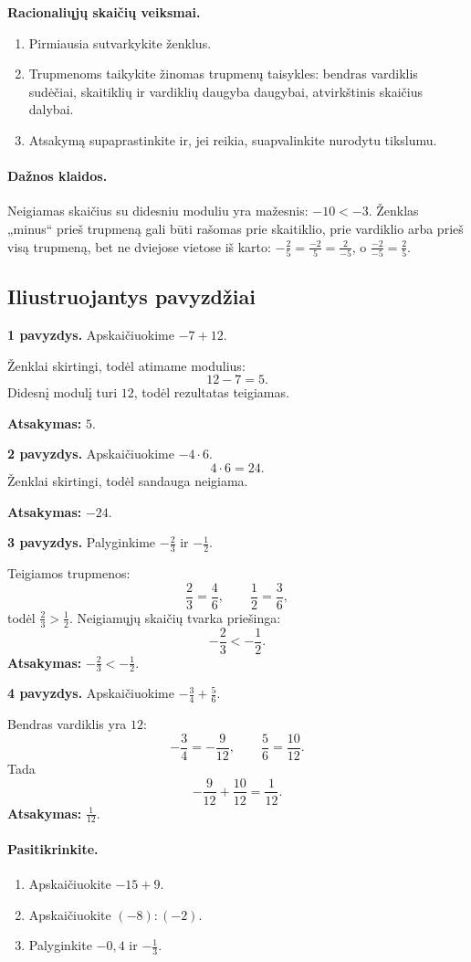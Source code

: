 \textbf{Racionaliųjų skaičių veiksmai.}
\begin{enumerate}[label=\arabic*.]
\item Pirmiausia sutvarkykite ženklus.
\item Trupmenoms taikykite žinomas trupmenų taisykles: bendras vardiklis sudėčiai, skaitiklių ir vardiklių daugyba daugybai, atvirkštinis skaičius dalybai.
\item Atsakymą supaprastinkite ir, jei reikia, suapvalinkite nurodytu tikslumu.
\end{enumerate}

\paragraph{Dažnos klaidos.}
Neigiamas skaičius su didesniu moduliu yra mažesnis: \(-10<-3\). Ženklas „minus“ prieš trupmeną gali būti rašomas prie skaitiklio, prie vardiklio arba prieš visą trupmeną, bet ne dviejose vietose iš karto: \(-\frac{2}{5}=\frac{-2}{5}=\frac{2}{-5}\), o \(\frac{-2}{-5}=\frac{2}{5}\).

\subsection{Iliustruojantys pavyzdžiai}
\textbf{1 pavyzdys.} Apskaičiuokime \(-7+12\).

Ženklai skirtingi, todėl atimame modulius:
\[
12-7=5.
\]
Didesnį modulį turi \(12\), todėl rezultatas teigiamas.

\textbf{Atsakymas:} \(5\).

\textbf{2 pavyzdys.} Apskaičiuokime \(-4\cdot 6\).
\[
4\cdot 6=24.
\]
Ženklai skirtingi, todėl sandauga neigiama.

\textbf{Atsakymas:} \(-24\).

\textbf{3 pavyzdys.} Palyginkime \(-\frac{2}{3}\) ir \(-\frac{1}{2}\).

Teigiamos trupmenos:
\[
\frac{2}{3}=\frac{4}{6},\qquad \frac{1}{2}=\frac{3}{6},
\]
todėl \(\frac{2}{3}>\frac{1}{2}\). Neigiamųjų skaičių tvarka priešinga:
\[
-\frac{2}{3}<-\frac{1}{2}.
\]
\textbf{Atsakymas:} \(-\frac{2}{3}<-\frac{1}{2}\).

\textbf{4 pavyzdys.} Apskaičiuokime \(-\frac{3}{4}+\frac{5}{6}\).

Bendras vardiklis yra \(12\):
\[
-\frac{3}{4}=-\frac{9}{12},\qquad \frac{5}{6}=\frac{10}{12}.
\]
Tada
\[
-\frac{9}{12}+\frac{10}{12}=\frac{1}{12}.
\]
\textbf{Atsakymas:} \(\frac{1}{12}\).

\paragraph{Pasitikrinkite.}
\begin{enumerate}[label=\arabic*.]
\item Apskaičiuokite \(-15+9\).
\item Apskaičiuokite \((-8):(-2)\).
\item Palyginkite \(-0,4\) ir \(-\frac{1}{3}\).
\end{enumerate}

